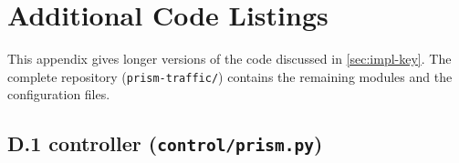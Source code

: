 \chapter{Additional Code Listings}\label{app:code}

This appendix gives longer versions of the code discussed in \cref{sec:impl-key}. The complete
repository (\texttt{prism-traffic/}) contains the remaining modules and the configuration files.

\section*{D.1 \prism{} controller (\texttt{control/prism.py})}

